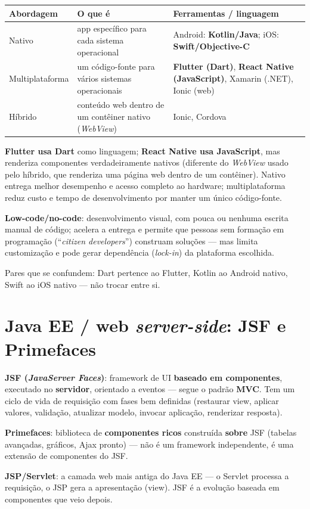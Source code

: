 \begin{conceito}
\begin{center}
\begin{tabular}{@{}p{2.6cm}p{3.4cm}p{4.4cm}@{}}
\toprule
\textbf{Abordagem} & \textbf{O que é} & \textbf{Ferramentas / linguagem} \\
\midrule
Nativo & app específico para cada sistema operacional & Android:
\textbf{Kotlin/Java}; iOS: \textbf{Swift/Objective-C} \\
Multiplataforma & um código-fonte para vários sistemas operacionais &
\textbf{Flutter (Dart)}, \textbf{React Native (JavaScript)}, Xamarin
(.NET), Ionic (web) \\
Híbrido & conteúdo web dentro de um contêiner nativo (\textit{WebView}) &
Ionic, Cordova \\
\bottomrule
\end{tabular}
\end{center}

\textbf{Flutter usa Dart} como linguagem; \textbf{React Native usa
JavaScript}, mas renderiza componentes verdadeiramente nativos (diferente
do \textit{WebView} usado pelo híbrido, que renderiza uma página web
dentro de um contêiner). Nativo entrega melhor desempenho e acesso
completo ao hardware; multiplataforma reduz custo e tempo de
desenvolvimento por manter um único código-fonte.

\textbf{Low-code/no-code}: desenvolvimento visual, com pouca ou nenhuma
escrita manual de código; acelera a entrega e permite que pessoas sem
formação em programação (“\textit{citizen developers}”) construam
soluções --- mas limita customização e pode gerar dependência
(\textit{lock-in}) da plataforma escolhida.
\end{conceito}

\begin{cuidado}
Pares que se confundem: Dart pertence ao Flutter, Kotlin ao Android
nativo, Swift ao iOS nativo --- não trocar entre si.
\end{cuidado}

\section{Java EE / web \textit{server-side}: JSF e Primefaces}

\begin{conceito}
\textbf{JSF (\textit{JavaServer Faces})}: framework de UI \textbf{baseado
em componentes}, executado no \textbf{servidor}, orientado a eventos ---
segue o padrão \textbf{MVC}. Tem um ciclo de vida de requisição com fases
bem definidas (restaurar view, aplicar valores, validação, atualizar
modelo, invocar aplicação, renderizar resposta).

\textbf{Primefaces}: biblioteca de \textbf{componentes ricos} construída
\textbf{sobre} JSF (tabelas avançadas, gráficos, Ajax pronto) --- não é um
framework independente, é uma extensão de componentes do JSF.

\textbf{JSP/Servlet}: a camada web mais antiga do Java EE --- o Servlet
processa a requisição, o JSP gera a apresentação (view). JSF é a evolução
baseada em componentes que veio depois.
\end{conceito}

